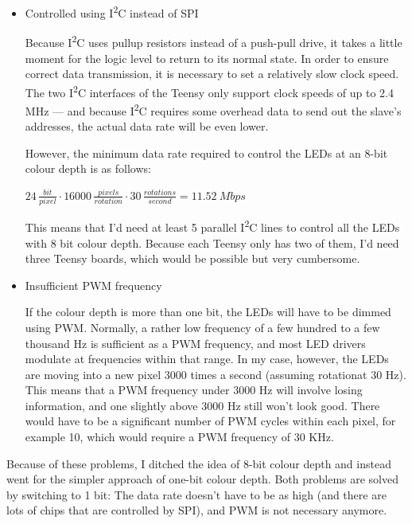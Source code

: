 \documentclass[a4paper, 11pt, titlepage]{report}
\def \itwoc {I\textsuperscript{2}C\xspace}
\newenvironment{ownmath}
{\vspace{2mm}\hspace{15pt}\begin{math}}
{\end{math}\vspace{2mm}}
\begin{document}
\begin{itemize}

\item Controlled using \itwoc  instead of SPI

Because \itwoc uses pullup resistors instead of a push-pull drive, it takes a little moment for
the logic level to return to its normal state. In order to ensure correct data transmission, it is
necessary to set a relatively slow clock speed. The two \itwoc interfaces of the Teensy only
support clock speeds of up to 2.4 MHz --- and because \itwoc requires some overhead data to send
out the slave's addresses, the actual data rate will be even lower.

However, the minimum data rate required to control the LEDs at an 8-bit colour depth is as follows:

\begin{ownmath}
24\,\frac{\si{bit}}{\si{pixel}} \cdot 16000\,\frac{\si{pixels}}{\si{rotation}} \cdot
30\,\frac{\si{rotations}}{\si{second}} = \SI{11.52}{Mbps}
\end{ownmath}

This means that I'd need at least 5 parallel \itwoc lines to control all the LEDs with 8 bit colour
depth. Because each Teensy only has two of them, I'd need three Teensy boards, which would be
possible but very cumbersome.

\item Insufficient PWM frequency

If the colour depth is more than one bit, the LEDs will have to be dimmed using PWM. Normally, a
rather low frequency of a few hundred to a few thousand Hz is sufficient as a PWM frequency, and
most LED drivers modulate at frequencies within that range. In my case, however, the LEDs are
moving into a new pixel 3000 times a second (assuming rotationat 30 Hz). This means that a PWM
frequency under 3000 Hz will involve losing information, and one slightly above 3000 Hz still
won't look good. There would have to be a significant number of PWM cycles within each pixel,
for example 10, which would require a PWM frequency of 30 KHz.

\end{itemize}

Because of these problems, I ditched the idea of 8-bit colour depth and instead went for the
simpler approach of one-bit colour depth. Both problems are solved by switching to 1 bit: The data
rate doesn't have to be as high (and there are lots of chips that are controlled by SPI), and PWM
is not necessary anymore.
\end{document}
